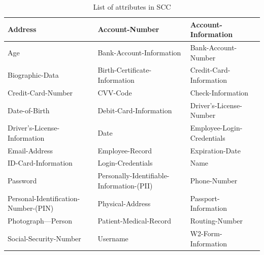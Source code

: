 \documentclass[letterpaper, 10 pt, conference]{ieeeconf}  %
\begin{document}
\begin{table}[h!]
\centering
\begin{tabu} to 0.45\textwidth { | X[l] | X[l] | X[l] | }
 \hline
    Address & Account-Number & Account-Information \\
    \hline
    Age & Bank-Account-Information & Bank-Account-Number \\
    \hline
    Biographic-Data & Birth-Certificate-Information & Credit-Card-Information \\
    \hline
    Credit-Card-Number & CVV-Code & Check-Information \\
    \hline
    Date-of-Birth & Debit-Card-Information & Driver's-License-Number \\
    \hline
    Driver's-License-Information & Date & Employee-Login-Credentials \\
    \hline
    Email-Address & Employee-Record & Expiration-Date \\
    \hline
    ID-Card-Information & Login-Credentials & Name \\
    \hline
    Password & Personally-Identifiable-Information-(PII) & Phone-Number \\
    \hline
    Personal-Identification-Number-(PIN) & Physical-Address & Passport-Information \\
    \hline
    Photograph---Person & Patient-Medical-Record & Routing-Number \\
    \hline
    Social-Security-Number & Username & W2-Form-Information \\
    \hline
\end{tabu}
\caption{List of attributes in SCC}
\label{table:1}
\end{table}



\end{document}
